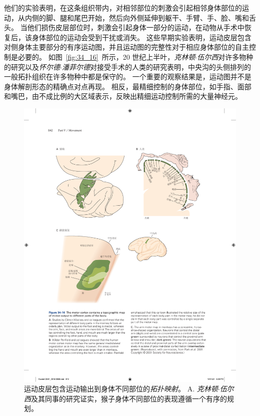 他们的实验表明，在这条组织带内，对相邻部位的刺激会引起相邻身体部位的运动，从内侧的脚、腿和尾巴开始，然后向外侧延伸到躯干、手臂、手、脸、嘴和舌头。
当他们损伤皮层部位时，刺激会引起身体一部分的运动，在动物从手术中恢复后，该身体部位的运动会受到干扰或消失。
这些早期实验表明，运动皮层包含对侧身体主要部分的有序运动图，并且运动图的完整性对于相应身体部位的自主控制是必要的。
如图~\ref{fig:34_16}~所示，20 世纪上半叶，\textit{克林顿$\cdot$伍尔西}对许多物种的研究以及\textit{怀尔德$\cdot$潘菲尔德}对接受手术的人类的研究表明，中央沟的头侧排列的一般拓扑组织在许多物种中都是保守的。
一个重要的观察结果是，运动图并不是身体解剖形态的精确点对点再现。
相反，最精细控制的身体部位，如手指、面部和嘴巴，由不成比例的大区域表示，反映出精细运动控制所需的大量神经元。


\begin{figure}[htbp]
	\centering
	\includegraphics[width=1.0\linewidth]{chap34/fig_34_16}
	\caption{运动皮层包含运动输出到身体不同部位的\textit{拓扑映射}。
		A. \textit{克林顿$\cdot$伍尔西}及其同事的研究证实，猴子身体不同部位的表现遵循一个有序的规划。
}
\end{figure}
